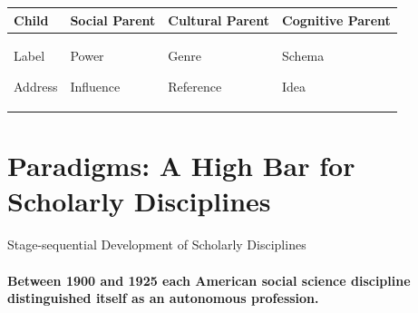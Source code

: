 \documentclass[]{article}
\begin{document}
\begin{longtable}[c]{@{}llll@{}}
\toprule
\begin{minipage}[b]{0.14\columnwidth}\raggedright\strut
\textbf{Child}
\strut\end{minipage} &
\begin{minipage}[b]{0.23\columnwidth}\raggedright\strut
\textbf{Social Parent}
\strut\end{minipage} &
\begin{minipage}[b]{0.25\columnwidth}\raggedright\strut
\textbf{Cultural Parent}
\strut\end{minipage} &
\begin{minipage}[b]{0.26\columnwidth}\raggedright\strut
\textbf{Cognitive Parent}
\strut\end{minipage}\tabularnewline
\midrule
\endhead
\begin{minipage}[t]{0.14\columnwidth}\raggedright\strut
Label

Address
\strut\end{minipage} &
\begin{minipage}[t]{0.23\columnwidth}\raggedright\strut
Power

Influence
\strut\end{minipage} &
\begin{minipage}[t]{0.25\columnwidth}\raggedright\strut
Genre

Reference
\strut\end{minipage} &
\begin{minipage}[t]{0.26\columnwidth}\raggedright\strut
Schema

Idea
\strut\end{minipage}\tabularnewline
\bottomrule
\end{longtable}

\section{Paradigms: A High Bar for Scholarly
Disciplines}\label{paradigms-a-high-bar-for-scholarly-disciplines}

Stage-sequential Development of Scholarly Disciplines

\paragraph{Between 1900 and 1925 each American social science discipline
distinguished itself as an autonomous
profession.}\label{between-1900-and-1925-each-american-social-science-discipline-distinguished-itself-as-an-autonomous-profession.}
\end{document}
